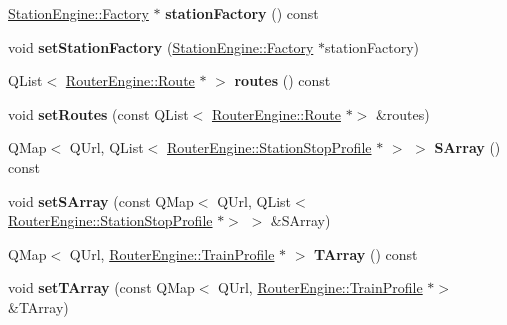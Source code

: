 \begin{DoxyCompactItemize}
\mbox{\hyperlink{classStationEngine_1_1Factory}{Station\+Engine\+::\+Factory}} $\ast$ {\bfseries station\+Factory} () const
\item 
\mbox{\label{classRouterEngine_1_1Planner_a0767e4341aa97bb7451de5ec0fd87563}} 
void {\bfseries set\+Station\+Factory} (\mbox{\hyperlink{classStationEngine_1_1Factory}{Station\+Engine\+::\+Factory}} $\ast$station\+Factory)
\item 
\mbox{\label{classRouterEngine_1_1Planner_a5fc863694446aa45cb56bb3c3ab4c5b4}} 
Q\+List$<$ \mbox{\hyperlink{classRouterEngine_1_1Route}{Router\+Engine\+::\+Route}} $\ast$ $>$ {\bfseries routes} () const
\item 
\mbox{\label{classRouterEngine_1_1Planner_a78127dc66f833ddc7263e2fca0b19b92}} 
void {\bfseries set\+Routes} (const Q\+List$<$ \mbox{\hyperlink{classRouterEngine_1_1Route}{Router\+Engine\+::\+Route}} $\ast$$>$ \&routes)
\item 
\mbox{\label{classRouterEngine_1_1Planner_a362360a5e60ee3f07e830e819d33110a}} 
Q\+Map$<$ Q\+Url, Q\+List$<$ \mbox{\hyperlink{classRouterEngine_1_1StationStopProfile}{Router\+Engine\+::\+Station\+Stop\+Profile}} $\ast$ $>$ $>$ {\bfseries S\+Array} () const
\item 
\mbox{\label{classRouterEngine_1_1Planner_aa199bf872a554e9088e0c76646fe4924}} 
void {\bfseries set\+S\+Array} (const Q\+Map$<$ Q\+Url, Q\+List$<$ \mbox{\hyperlink{classRouterEngine_1_1StationStopProfile}{Router\+Engine\+::\+Station\+Stop\+Profile}} $\ast$$>$ $>$ \&S\+Array)
\item 
\mbox{\label{classRouterEngine_1_1Planner_ac09c55292b81273f4b338debb2e1e5ce}} 
Q\+Map$<$ Q\+Url, \mbox{\hyperlink{classRouterEngine_1_1TrainProfile}{Router\+Engine\+::\+Train\+Profile}} $\ast$ $>$ {\bfseries T\+Array} () const
\item 
\mbox{\label{classRouterEngine_1_1Planner_a5feff3fff4cba045a4964bea34309ee8}} 
void {\bfseries set\+T\+Array} (const Q\+Map$<$ Q\+Url, \mbox{\hyperlink{classRouterEngine_1_1TrainProfile}{Router\+Engine\+::\+Train\+Profile}} $\ast$$>$ \&T\+Array)
$$
\end{DoxyCompactItemize}
